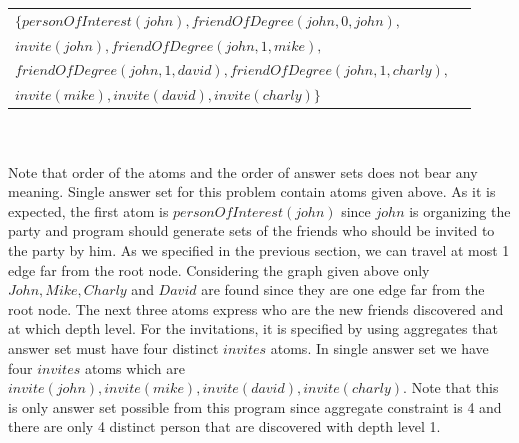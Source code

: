 \documentclass[14pt,a4paper, titlepage]{article}
\begin{document}
\begin{tabular}{ l r }
   $\mathit{\{personOfInterest(john), 
   friendOfDegree(john,0,john), }$& \\
   $\mathit{invite(john), friendOfDegree(john,1,mike),}$& 
   \\
   $\mathit{friendOfDegree(john,1,david), 
   friendOfDegree(john,1,charly),}$ & \\
   $\mathit{invite(mike),invite(david),invite(charly)\}}$
 \end{tabular}
\\ \\
Note that order of the atoms and the order of answer sets 
does not bear any meaning. Single answer set for this 
problem contain atoms given above. As it is expected, the 
first atom is $\mathit{personOfInterest(john)}$ 
since $\mathit{john}$ is organizing the party and program 
should generate sets of the friends who should be invited 
to the party by him. As we specified in the previous 
section, we can travel at most 1 edge far from the root 
node. Considering the graph given above only $\mathit{John, 
Mike, Charly}$ and $\mathit{David}$ are found since they 
are one edge far from the root node. The next three atoms 
express who are the new friends discovered and at which 
depth 
level. For the invitations, it is specified by using 
aggregates that answer set must have four distinct 
$\mathit{invites}$ atoms.
In single answer set we have four $\mathit{invites}$ atoms 
which are $\mathit{invite(john), 
invite(mike), invite(david), invite(charly)}$. Note that 
this is only answer set possible 
from this program since aggregate constraint is 4 and there 
are only 4 distinct person that are discovered with depth 
level 1. 
\end{document}
